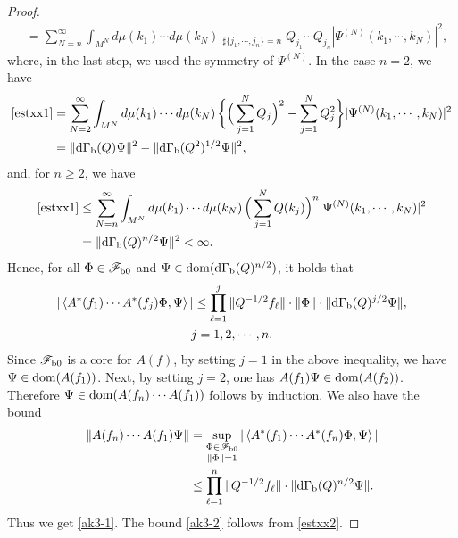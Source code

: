 \documentclass[12pt]{article}
\theoremstyle{plain}
\numberwithin{equation}{section}
\theoremstyle{remark}
\begin{document}
\begin{proof}
\begin{align}
&= \sum_{N=n}^\infty  \int_{M^N} d\mu(k_1)\cdots d\mu(k_N) \mathop{\sum_{j_1,\cdots,j_n=1}^N}_{\sharp \{j_1,\cdots,j_n\}=n} 
   Q_{j_1}\cdots Q_{j_n}| \Psi^{(N)}(k_1,\cdots,k_N)|^2,  \label{estxx1}
\end{align}
where, in the last step, we used the symmetry of $\Psi^{(N)}$.
In the case $n=2$, we have 
\begin{align}
\eqref{estxx1}
& = \sum_{N=2}^\infty \int_{M^N} d\mu(k_1)\cdots d\mu(k_N)\,\bigg\{ \Big( \sum_{j=1}^N Q_j \Big)^2 -\sum_{j=1}^N Q_j^2 \bigg\} 
    |\Psi^{(N)}(k_1,\cdots,k_N)|^2 \notag \\
& = \| \mathrm{d\Gamma_b}(Q)\Psi \|^2 - \| \mathrm{d\Gamma_b}(Q^2)^{1/2}\Psi \|^2,  \label{estxx2}
\end{align}
and, for $n\geq 2$, we have
\begin{align*}
\eqref{estxx1} 
& \leq  \sum_{N=n}^\infty  \int_{M^N} d\mu(k_1)\cdots d\mu(k_N)\,\Big( \sum_{j=1}^N Q(k_j)\Big)^n | \Psi^{(N)}(k_1,\cdots,k_N)|^2 \\
& = \| \mathrm{d\Gamma_b}(Q)^{n/2}\Psi \| ^2 < \infty.
\end{align*}
Hence, for all $\Phi\in\mathscr{F}_{\mathrm{b}0}$ and $\Psi\in\mathop{\mathrm{dom}}(\mathrm{d\Gamma_b}(Q)^{n/2})$, it holds that 
\begin{multline*}
  |\left\langle A^*(f_1)\cdots A^*(f_j)\Phi,\Psi\right\rangle|
 \leq \prod_{\ell=1}^j \| Q^{-1/2}f_\ell \| \cdot \| \Phi \|\cdot \| \mathrm{d\Gamma_b}(Q)^{j/2}\Psi \|,\\ j=1,2,\cdots,n.
\end{multline*}
Since $\mathscr{F}_{\mathrm{b}0}$ is a core for $A(f)$, by setting $j=1$ in the above inequality, we have $\Psi\in\mathop{\mathrm{dom}}(A(f_1))$.
Next, by setting $j=2$, one has $A(f_1)\Psi \in\mathop{\mathrm{dom}}(A(f_2))$.
Therefore $\Psi\in \mathop{\mathrm{dom}}(A(f_n)\cdots A(f_1))$ follows by induction.
We also have the bound
\begin{align*}
 \| A(f_n)\cdots A(f_1)\Psi \| 
&= \mathop{\sup_{\Phi\in\mathscr{F}_{\mathrm{b}0}}}_\mathrm{\| \Phi \|=1}
  |\left\langle A^*(f_1)\cdots A^*(f_n)\Phi,\Psi\right\rangle| \\
& \leq \prod_{\ell=1}^n \| Q^{-1/2}f_\ell \| \cdot \| \mathrm{d\Gamma_b}(Q)^{n/2}\Psi \|.
\end{align*}
Thus we get \eqref{ak3-1}. The bound \eqref{ak3-2} follows from \eqref{estxx2}.
\end{proof}
\end{document}
